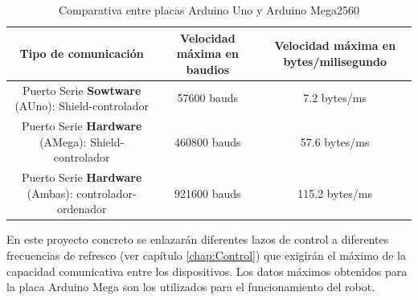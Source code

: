 	 \begin{table}[H]
	 	\caption{Comparativa entre placas Arduino Uno y Arduino Mega2560}
	 	\label{tab:comunication_serial}
	 		\begin{center}
	 			\begin{tabular}{ |c|c|c| }
	 				\hline
	 				\textbf{Tipo de comunicación}& \begin{minipage}{.30\linewidth} \textbf{Velocidad máxima  en baudios}  \end{minipage}& \begin{minipage}{.30\linewidth} \textbf{Velocidad máxima en bytes/milisegundo} \end{minipage} \\
	 				\hline
	 				\begin{minipage}{.30\linewidth}\vspace{2pt} Puerto Serie \textbf{Sowtware} (AUno):  Shield-controlador \vspace{2pt} \end{minipage} & 57600 bauds & 7.2 bytes/ms \\
	 				\hline
	 				\begin{minipage}{.30\linewidth}\vspace{2pt} Puerto Serie \textbf{Hardware} (AMega):  Shield-controlador \vspace{2pt} \end{minipage} & 460800 bauds & 57.6 bytes/ms \\
	 				\hline
	 				\begin{minipage}{.30\linewidth}\vspace{2pt} Puerto Serie \textbf{Hardware} (Ambas):  controlador-ordenador \vspace{2pt} \end{minipage} & 921600 bauds & 115.2 bytes/ms \\
	 				\hline
	 			\end{tabular}
	 		\end{center}
	 \end{table}

	 En este proyecto concreto se enlazarán diferentes lazos de control a diferentes frecuencias de refresco (ver capítulo \ref{chap:Control}) que exigirán el máximo de la capacidad comunicativa entre los dispositivos. Los datos máximos obtenidos para la placa Arduino Mega son los utilizados para el funcionamiento del robot.

